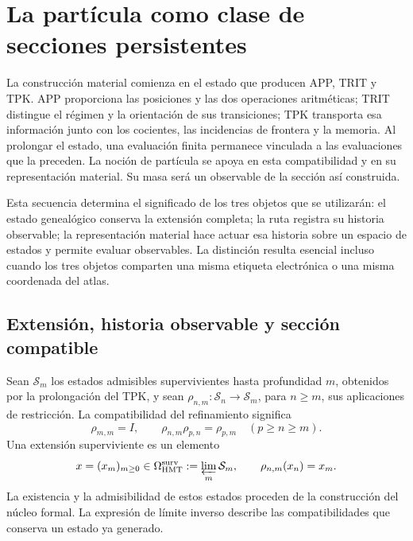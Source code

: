 \section{La partícula como clase de secciones persistentes}
\label{vi:vi:sec:particula}

La construcción material comienza en el estado que producen APP, TRIT y
TPK. APP proporciona las posiciones y las dos operaciones aritméticas;
TRIT distingue el régimen y la orientación de sus transiciones; TPK
transporta esa información junto con los cocientes, las incidencias de
frontera y la memoria. Al prolongar el estado, una evaluación finita
permanece vinculada a las evaluaciones que la preceden. La noción de
partícula se apoya en esta compatibilidad y en su representación material.
Su masa será un observable de la sección así construida.

Esta secuencia determina el significado de los tres objetos que se
utilizarán: el estado genealógico conserva la extensión completa; la ruta
registra su historia observable; la representación material hace actuar
esa historia sobre un espacio de estados y permite evaluar observables.
La distinción resulta esencial incluso cuando los tres objetos comparten
una misma etiqueta electrónica o una misma coordenada del atlas.

\subsection{Extensión, historia observable y sección compatible}
\label{vi:vi:subsec:extension-persistente}

Sean $\mathcal S_m$ los estados admisibles supervivientes hasta profundidad
$m$, obtenidos por la prolongación del TPK, y sean
$\rho_{n,m}:\mathcal S_n\to\mathcal S_m$, para $n\geq m$, sus
aplicaciones de restricción. La compatibilidad del refinamiento significa
\begin{equation}
 \rho_{m,m}=I,\qquad
 \rho_{n,m}\rho_{p,n}=\rho_{p,m}\quad(p\geq n\geq m).
 \label{vi:vi:eq:sistema-estados}
\end{equation}
Una extensión superviviente es un elemento
\begin{equation}
 x=(x_m)_{m\geq0}\in\Omega^{\mathrm{surv}}_{\mathrm{HMT}}
 :=\varprojlim_m\mathcal S_m,
 \qquad \rho_{n,m}(x_n)=x_m.
 \label{vi:vi:eq:extension-superviviente}
\end{equation}
La existencia y la admisibilidad de estos estados proceden de la
construcción del núcleo formal. La expresión de límite inverso describe
las compatibilidades que conserva un estado ya generado.

